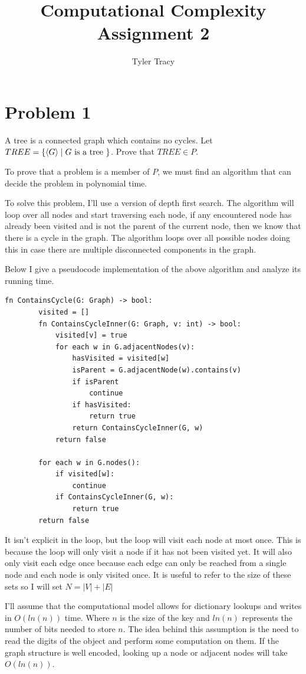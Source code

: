 \documentclass[12pt]{article}
\title{Computational Complexity Assignment 2}
\author{Tyler Tracy}
\begin{document}
\maketitle


\section*{Problem 1}

\begin{questionbox}
	A tree is a connected graph which contains no cycles. Let $TREE = \{ \braket{G} \mid G \text{ is a tree } \}$. Prove that $TREE \in P$.
\end{questionbox}

To prove that a problem is a member of $P$, we must find an algorithm that can decide the problem in polynomial time.

To solve this problem, I'll use a version of depth first search. The algorithm will loop over all nodes and start traversing each node, if any encountered node has already been visited and is not the parent of the current node, then we know that there is a cycle in the graph. The algorithm loops over all possible nodes doing this in case there are multiple disconnected components in the graph.

Below I give a pseudocode implementation of the above algorithm and analyze its running time.

\begin{lstlisting}[basicstyle=\small, tabsize=3]
	fn ContainsCycle(G: Graph) -> bool:
		visited = []
		fn ContainsCycleInner(G: Graph, v: int) -> bool:
			visited[v] = true
			for each w in G.adjacentNodes(v):
				hasVisited = visited[w]
				isParent = G.adjacentNode(w).contains(v)
				if isParent
					continue
				if hasVisited:
					return true
				return ContainsCycleInner(G, w)
			return false

		for each w in G.nodes():
			if visited[w]:
				continue
			if ContainsCycleInner(G, w):
				return true
		return false
\end{lstlisting}

It isn't explicit in the loop, but the loop will visit each node at most once. This is because the loop will only visit a node if it has not been visited yet. It will also only visit each edge once because each edge can only be reached from a single node and each node is only visited once. It is useful to refer to the size of these sets so I will set $N = |V| + |E|$

I'll assume that the computational model allows for dictionary lookups and writes in $O(ln(n))$ time. Where $n$ is the size of the key and $ln(n)$ represents the number of bits needed to store $n$. The idea behind this assumption is the need to read the digits of the object and perform some computation on them. If the graph structure is well encoded, looking up a node or adjacent nodes will take $O(ln(n))$.
\end{document}
